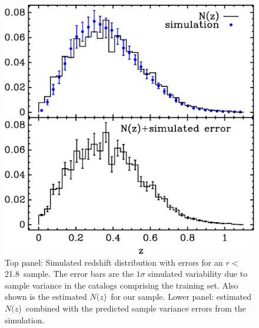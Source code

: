 \documentclass[12pt,preprint]{aastex}
\newcommand{\rmax}{21.8}
\newcommand{\nofz}{$N(z$)}
\begin{document}
\begin{figure}[t]\centering
    \includegraphics[scale=0.6]{figures/nzsigf-edges-12-nofz-sim-errors-2panel.eps}

    \caption{Top panel: Simulated redshift distribution with errors for an
    $r<$ \rmax\ sample.  The error bars are the $1 \sigma$ simulated
    variability due to sample variance in the catalogs comprising the training
    set.  Also shown is the estimated \nofz\ for our sample.  Lower panel:
    estimated \nofz\ combined with the predicted sample variance errors from
    the simulation.}

    \label{fig:ebars}
    \vspace{2em}
\end{figure}
\end{document}
